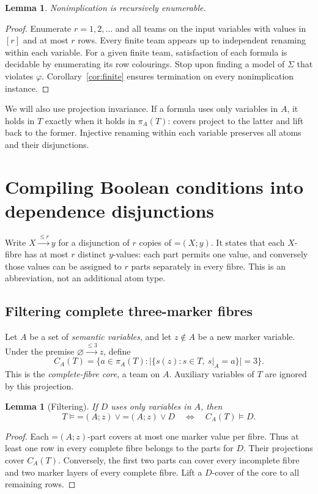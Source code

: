 \documentclass[11pt,a4paper]{article}
\newcommand{\dep}[2]{\mathord{=}(#1;#2)}
\newcommand{\ND}[3]{#1\xrightarrow{\leq #3}#2}
\newtheorem{lemma}[theorem]{Lemma}
\theoremstyle{definition}
\begin{document}
\begin{lemma}
\label{lem:enumeration}
Nonimplication is recursively enumerable.
\end{lemma}
\begin{proof}
Enumerate $r=1,2,\ldots$ and all teams on the input variables with
values in $[r]$ and at most $r$ rows. Every finite team appears up to
independent renaming within each variable. For a given finite team,
satisfaction of each formula is decidable by enumerating its row
colourings. Stop upon finding a model of $\Sigma$ that violates
$\varphi$. Corollary~\ref{cor:finite} ensures termination on every
nonimplication instance.
\end{proof}

We will also use projection invariance. If a formula uses only variables
in $A$, it holds in $T$ exactly when it holds in $\pi_A(T)$: covers
project to the latter and lift back to the former. Injective renaming
within each variable preserves all atoms and their disjunctions.

\section{Compiling Boolean conditions into dependence disjunctions}
\label{sec:compiler}
Write $\ND Xyr$ for a disjunction of $r$ copies of $\dep Xy$.
It states that each $X$-fibre has at most $r$ distinct $y$-values:
each part permits one value, and conversely those values can be assigned
to $r$ parts separately in every fibre. This is an abbreviation,
not an additional atom type.

\subsection{Filtering complete three-marker fibres}
Let $A$ be a set of \emph{semantic variables}, and let $z\notin A$
be a new marker variable. Under the premise $\ND\varnothing z3$, define
\[
 C_A(T)=\{a\in\pi_A(T):
       |\{s(z):s\in T,\ s|_A=a\}|=3\}.
\]
This is the \emph{complete-fibre core}, a team on $A$. Auxiliary
variables of $T$ are ignored by this projection.

\begin{lemma}[Filtering]
\label{lem:filter}
If $D$ uses only variables in $A$, then
\[
 T\models\dep Az\vee\dep Az\vee D
 \quad\Longleftrightarrow\quad C_A(T)\models D.
\]
\end{lemma}
\begin{proof}
Each $\dep Az$-part covers at most one marker value per fibre.
Thus at least one row in every complete fibre belongs to the parts
for $D$. Their projections cover $C_A(T)$.
Conversely, the first two parts can cover every incomplete fibre and
two marker layers of every complete fibre. Lift a $D$-cover of the
core to all remaining rows.
\end{proof}
\end{document}
